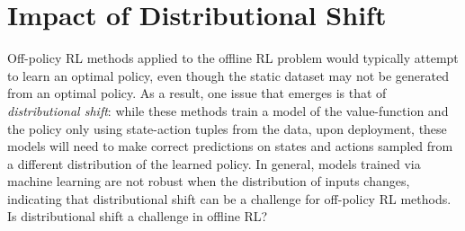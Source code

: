 \vspace{-0.2cm}
\section{Impact of Distributional Shift}
\label{sec:sampling_distributions}
\vspace{-0.2cm}




Off-policy RL methods applied to the offline RL problem would typically attempt to learn an optimal policy, even though the static dataset may not be generated from an optimal policy. As a result, one issue that emerges is that of \emph{distributional shift}: while these methods train a model of the value-function and the policy only using state-action tuples from the data, upon deployment, these models will need to make correct predictions on states and actions sampled from a different distribution of the learned policy. In general, models trained via machine learning are not robust when the distribution of inputs changes, indicating that distributional shift can be a challenge for off-policy RL methods. Is distributional shift a challenge in offline RL?

